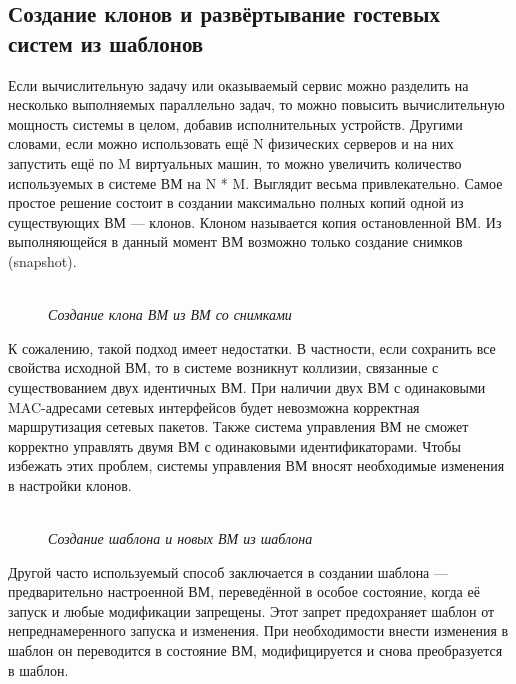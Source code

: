 \documentclass[14pt, a4paper]{article}
\begin{document}
\subsection*{Создание клонов и развёртывание гостевых систем из
шаблонов} 

Если вычислительную задачу или оказываемый сервис можно разделить на несколько выполняемых
параллельно задач, то можно повысить вычислительную мощность системы в целом, добавив
исполнительных устройств. Другими словами, если можно использовать ещё N физических серверов
и на них запустить ещё по M виртуальных машин, то можно увеличить количество используемых в
системе ВМ на N * M. Выглядит весьма привлекательно. Самое простое решение состоит в создании
максимально полных копий одной из существующих ВМ — клонов. Клоном называется копия
остановленной ВМ. Из выполняющейся в данный момент ВМ возможно только создание снимков
(snapshot).


\begin{figure}[h]
    \centering
    \\ 
    \small\textit{Создание клона ВМ из ВМ со снимками}  
    \label{framework} 
\end{figure}

К сожалению, такой подход имеет недостатки. В частности, если сохранить все свойства исходной
ВМ, то в системе возникнут коллизии, связанные с существованием двух идентичных ВМ. При
наличии двух ВМ с одинаковыми MAC-адресами сетевых интерфейсов будет невозможна корректная
маршрутизация сетевых пакетов. Также система управления ВМ не сможет корректно управлять
двумя ВМ с одинаковыми идентификаторами. Чтобы избежать этих проблем, системы управления ВМ
вносят необходимые изменения в настройки клонов.

\begin{figure}[h]
    \centering
    \\ 
    \small\textit{Создание шаблона и новых ВМ из шаблона}  
    \label{framework} 
\end{figure}

Другой часто используемый способ заключается в создании шаблона — предварительно настроенной
ВМ, переведённой в особое состояние, когда её запуск и любые модификации запрещены. Этот
запрет предохраняет шаблон от непреднамеренного запуска и изменения. При необходимости внести
изменения в шаблон он переводится в состояние ВМ, модифицируется и снова преобразуется в
шаблон.
\end{document}
